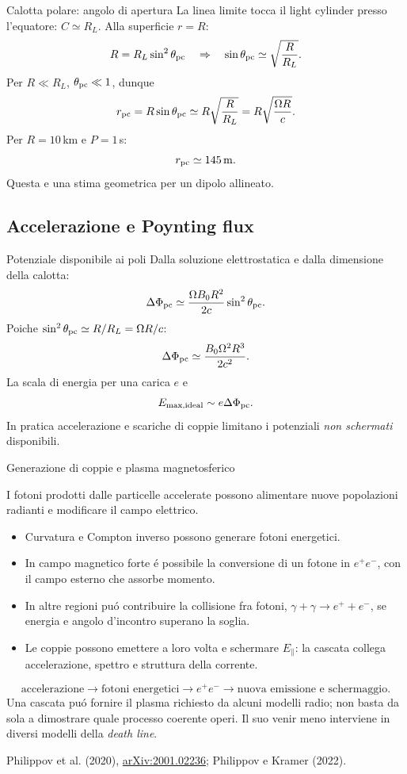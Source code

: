 \begin{frame}[t]{Calotta polare: angolo di apertura}
\small
La linea limite tocca il light cylinder presso l'equatore: $C\simeq R_L$.
Alla superficie $r=R$:
\[
R=R_L\sin^2\theta_{\rm pc}
\quad\Rightarrow\quad
\sin\theta_{\rm pc}\simeq\sqrt{\frac R{R_L}}.
\]
Per $R\ll R_L$, $\theta_{\rm pc}\ll1$, dunque
\[
r_{\rm pc}=R\sin\theta_{\rm pc}
\simeq R\sqrt{\frac R{R_L}}
=R\sqrt{\frac{\Omega R}c}.
\]
Per $R=10\,$km e $P=1\,$s:
\[
r_{\rm pc}\simeq145\,\mathrm m.
\]
Questa e una stima geometrica per un dipolo allineato.
\end{frame}

\subsection{Accelerazione e Poynting flux}

\begin{frame}[t]{Potenziale disponibile ai poli}
\small
Dalla soluzione elettrostatica e dalla dimensione della calotta:
\[
\Delta\Phi_{\rm pc}\simeq\frac{\Omega B_0 R^2}{2c}
\sin^2\theta_{\rm pc}.
\]
Poiche $\sin^2\theta_{\rm pc}\simeq R/R_L=\Omega R/c$:
\[
\Delta\Phi_{\rm pc}\simeq
\frac{B_0\Omega^2R^3}{2c^2}.
\]
La scala di energia per una carica $e$ e
\[
E_{\rm max,ideal}\sim e\Delta\Phi_{\rm pc}.
\]
In pratica accelerazione e scariche di coppie limitano i potenziali \emph{non schermati} disponibili.
\end{frame}

\begin{frame}[t]{Generazione di coppie e plasma magnetosferico}
\small\raggedright
I fotoni prodotti dalle particelle accelerate possono alimentare
nuove popolazioni radianti e modificare il campo elettrico.
\begin{itemize}
\item Curvatura e Compton inverso possono generare fotoni energetici.
\item In campo magnetico forte \'e possibile la conversione
di un fotone in $e^+e^-$, con il campo esterno che assorbe momento.
\item In altre regioni pu\'o contribuire la collisione fra fotoni,
$\gamma+\gamma\to e^++e^-$, se energia e angolo d'incontro superano la soglia.
\item Le coppie possono emettere a loro volta e schermare $E_\parallel$:
la cascata collega accelerazione, spettro e struttura della corrente.
\end{itemize}
\[
\text{accelerazione}\to\text{fotoni energetici}
\to e^+e^-\to\text{nuova emissione e schermaggio}.
\]
Una cascata pu\'o fornire il plasma richiesto da alcuni modelli radio;
non basta da sola a dimostrare quale processo coerente operi.
Il suo venir meno interviene in diversi modelli della \emph{death line}.
\par\smallskip
\footnotesize Philippov et al. (2020),
\href{https://arxiv.org/abs/2001.02236}{arXiv:2001.02236};
Philippov e Kramer (2022).
\end{frame}

